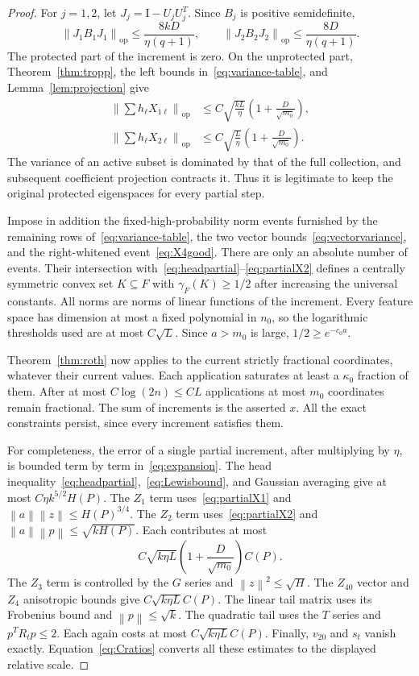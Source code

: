 \documentclass[11pt]{article}
\theoremstyle{remark}\newtheorem{remark}[theorem]{Remark}
\newcommand{\op}{\mathrm{op}}\newcommand{\Frob}{\mathrm F}
\newcommand{\norm}[1]{\left\lVert#1\right\rVert}\newcommand{\abs}[1]{\left|#1\right|}
\newcommand{\Id}{\mathrm I}\newcommand{\dbar}{\bar d}
\numberwithin{equation}{section}
\begin{document}
\begin{proof}
For $j=1,2$, let $J_j=\Id-U_jU_j^T$. Since $B_j$ is positive semidefinite,
\[
 \norm{J_1B_1J_1}_\op\le\frac{8kD}{\eta(q+1)},\qquad
 \norm{J_2B_2J_2}_\op\le\frac{8D}{\eta(q+1)}.
\]
The protected part of the increment is zero. On the unprotected part, Theorem~\ref{thm:tropp}, the left bounds in~\eqref{eq:variance-table}, and Lemma~\ref{lem:projection} give
\begin{align}
 \norm{\sum h_\ell X_{1\ell}}_\op
 &\le C\sqrt{\frac{kL}{\eta}}\left(1+\frac D{\sqrt{m_0}}\right),\label{eq:partialX1}\\
 \norm{\sum h_\ell X_{2\ell}}_\op
 &\le C\sqrt{\frac{L}{\eta}}\left(1+\frac D{\sqrt{m_0}}\right).\label{eq:partialX2}
\end{align}
The variance of an active subset is dominated by that of the full collection, and subsequent coefficient projection contracts it. Thus it is legitimate to keep the original protected eigenspaces for every partial step.

Impose in addition the fixed-high-probability norm events furnished by the remaining rows of~\eqref{eq:variance-table}, the two vector bounds~\eqref{eq:vectorvariance}, and the right-whitened event~\eqref{eq:X4good}. There are only an absolute number of events. Their intersection with~\eqref{eq:headpartial}--\eqref{eq:partialX2} defines a centrally symmetric convex set $K\subseteq F$ with $\gamma_F(K)\ge1/2$ after increasing the universal constants. All norms are norms of linear functions of the increment. Every feature space has dimension at most a fixed polynomial in $n_0$, so the logarithmic thresholds used are at most $C\sqrt L$. Since $a>m_0$ is large, $1/2\ge e^{-c_0a}$.

Theorem~\ref{thm:roth} now applies to the current strictly fractional coordinates, whatever their current values. Each application saturates at least a $\kappa_0$ fraction of them. After at most $C\log(2n)\le CL$ applications at most $m_0$ coordinates remain fractional. The sum of increments is the asserted $x$. All the exact constraints persist, since every increment satisfies them.

For completeness, the error of a single partial increment, after multiplying by $\eta$, is bounded term by term in~\eqref{eq:expansion}. The head inequality~\eqref{eq:headpartial},~\eqref{eq:Lewisbound}, and Gaussian averaging give at most $C\eta k^{5/2}H(P)$. The $Z_1$ term uses~\eqref{eq:partialX1} and $\norm a\norm z\le H(P)^{3/4}$. The $Z_2$ term uses~\eqref{eq:partialX2} and $\norm a\norm p\le\sqrt{kH(P)}$. Each contributes at most
\[
 C\sqrt{k\eta L}\left(1+\frac D{\sqrt{m_0}}\right)C(P).
\]
The $Z_3$ term is controlled by the $G$ series and $\norm z^2\le\sqrt H$. The $Z_{40}$ vector and $Z_4$ anisotropic bounds give $C\sqrt{k\eta L}C(P)$. The linear tail matrix uses its Frobenius bound and $\norm p\le\sqrt k$. The quadratic tail uses the $T$ series and $p^TR_tp\le2$. Each again costs at most $C\sqrt{k\eta L}C(P)$. Finally, $v_{20}$ and $s_t$ vanish exactly. Equation~\eqref{eq:Cratios} converts all these estimates to the displayed relative scale.


\end{proof}
\end{document}
